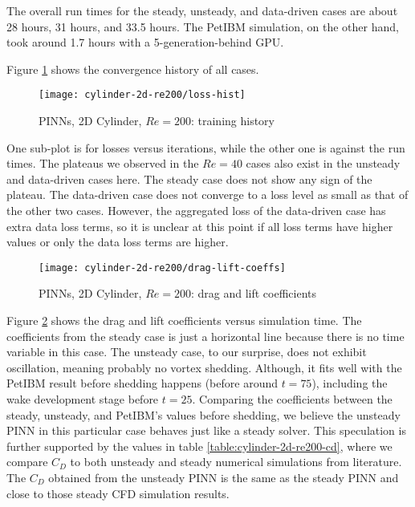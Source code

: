 The overall run times for the steady, unsteady, and data-driven cases are about 28 hours, 31 hours, and 33.5 hours.
The PetIBM simulation, on the other hand, took around 1.7 hours with a 5-generation-behind GPU.

Figure \ref{fig:cylinder-re200-train-hist} shows the convergence history of all cases.
\begin{figure}[hbt!]
    \texttt{[image: cylinder-2d-re200/loss-hist]}
    \caption{PINNs, 2D Cylinder, $Re=200$: training history}
    \label{fig:cylinder-re200-train-hist}
\end{figure}
One sub-plot is for losses versus iterations, while the other one is against the run times.
The plateaus we observed in the $Re=40$ cases also exist in the unsteady and data-driven cases here.
The steady case does not show any sign of the plateau.
The data-driven case does not converge to a loss level as small as that of the other two cases.
However, the aggregated loss of the data-driven case has extra data loss terms, so it is unclear at this point if all loss terms have higher values or only the data loss terms are higher. 



\begin{figure}[hbt!]
    \texttt{[image: cylinder-2d-re200/drag-lift-coeffs]}
    \caption{PINNs, 2D Cylinder, $Re=200$: drag and lift coefficients}
    \label{fig:cylinder-re200-drag-lift}
\end{figure}

Figure \ref{fig:cylinder-re200-drag-lift} shows the drag and lift coefficients versus simulation time.
The coefficients from the steady case is just a horizontal line because there is no time variable in this case.
The unsteady case, to our surprise, does not exhibit oscillation, meaning probably no vortex shedding.
Although, it fits well with the PetIBM result before shedding happens (before around $t=75$), including the wake development stage before $t=25$.
Comparing the coefficients between the steady, unsteady, and PetIBM's values before shedding, we believe the unsteady PINN in this particular case behaves just like a steady solver.
This speculation is further supported by the values in table \ref{table:cylinder-2d-re200-cd}, where we compare $C_D$ to both unsteady and steady numerical simulations from literature.
The $C_D$ obtained from the unsteady PINN is the same as the steady PINN and close to those steady CFD simulation results.

